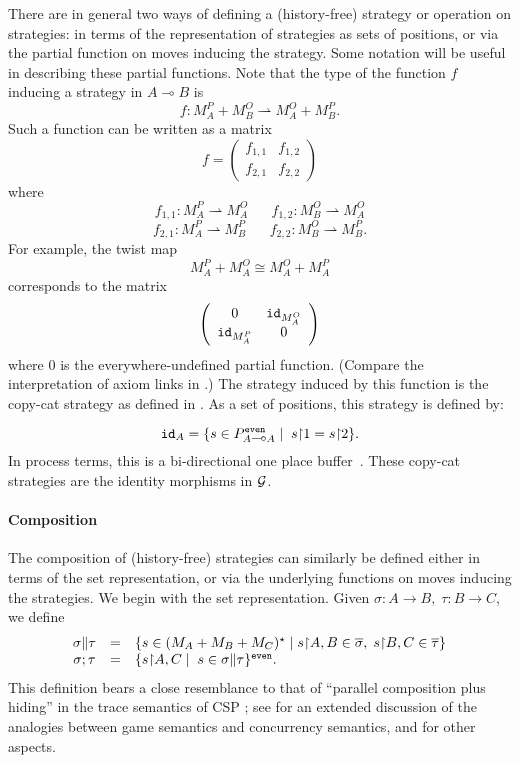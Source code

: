 \documentclass[11pt]{article}
\newcommand{\Mat}[4]{\left( \begin{array}{cc}
#1 & #2 \\
#3 & #4
\end{array} \right)}
\newcommand{\ident}[1]{{\tt id}_{#1}}
\newcommand{\Rest}{{\upharpoonright}}
\newcommand{\Pfr}{\rightharpoonup}
\newcommand{\Over}[1]{\overline{ #1 }}
\newcommand{\linimpl}{\mbox{$\multimap$}}
\newcommand{\Games}{\mbox{$\cal{G}$}}
\begin{document}
There are in general two ways of defining a (history-free) strategy or operation
on strategies: in terms of the representation of strategies as sets of
positions, or via the partial function on moves inducing the strategy.
Some notation
will be useful in describing these partial functions.
Note that the type of the function $f$ inducing a strategy in $A \linimpl B$
is
\[ f : M_{A}^{P} + M_{B}^{O} \Pfr M_{A}^{O} + M_{B}^{P}. \]
Such a function can be written as a matrix
\[ f = \Mat{f_{1,1}}{f_{1,2}}{f_{2,1}}{f_{2,2}} \]
where
\[ f_{1,1} : M_{A}^{P} \Pfr M_{A}^{O} \;\;\;\; \;\; f_{1,2} : M_{B}^{O} \Pfr
M_{A}^{O} \]
\[ f_{2,1} : M_{A}^{P} \Pfr M^{P}_{B} \;\;\;\;\;\; f_{2,2} : M_{B}^{O} \Pfr
M_{B}^{P} . \]
For example, the twist map
\[ M_{A}^{P} + M_{A}^{O} \cong M_{A}^{O} + M_{A}^{P} \]
corresponds to the matrix
\[ \Mat{0}{\ident{M_{A}^{O}}}{\ident{M_{A}^{P}}}{0} \]
where $0$ is the everywhere-undefined partial function.
(Compare the interpretation
of axiom links in \cite{GirardJY:geoi1i}.) The strategy induced by this function is
the copy-cat strategy as defined in \cite{AbramskyS:gamfcm}.
As a set of positions, this strategy is defined by:

\[ \ident{A} = \{ s \in P^{\tt even}_{A \linimpl A} \mid \; s
{\upharpoonright} 1 = s {\upharpoonright} 2 \} . \]
In process terms, this is a bi-directional one place
buffer~\cite{AbramskyS:prop}.
These copy-cat strategies are the identity morphisms in \Games .

\paragraph{Composition}
The composition of (history-free) strategies can similarly
be defined either
in terms of the set representation, or via the underlying functions on moves
inducing the strategies.  We begin with the set representation.
Given $\sigma: A
\rightarrow B, \;
\tau: B \rightarrow C$, we define
\[ \begin{array}{ccl}
\sigma \| \tau & = & \{ s \in (M_A + M_B + M_C )^{\star} \mid
s \Rest A, B \in \Over{\sigma}, \; s \Rest B, C \in \Over{\tau} \} \\
\sigma; \tau & = & \{ s {\upharpoonright} A,C \mid \; s \in \sigma \| \tau
 \}^{\tt even} .
\end{array} \]
This definition bears a close resemblance to that of ``parallel composition
plus hiding'' in the trace semantics of CSP \cite{HoareCAR:comsp};
see \cite{AbramskyS:gamfcm} for an extended
discussion of the analogies between game semantics and concurrency
semantics, and \cite{AbramskyS:prop} for other aspects.
\end{document}
